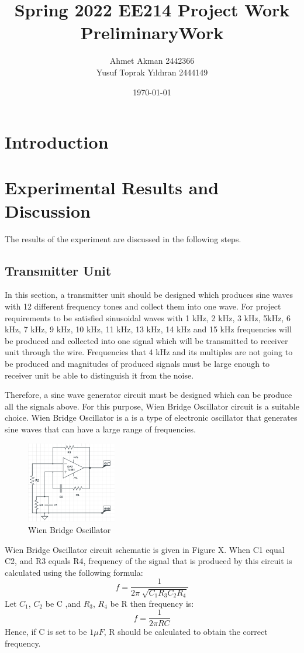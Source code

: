 \documentclass[letterpaper,12pt]{article}
\begin{document}
\thispagestyle{empty}

\title{Spring 2022 EE214 Project Work  \protect\\ PreliminaryWork }
\author{Ahmet Akman 2442366 \protect\\ Yusuf Toprak Yıldıran 2444149 }
\date{\today}
\maketitle
\tableofcontents
\section{Introduction}
\section{Experimental Results and Discussion}
The results of the experiment are discussed in the following steps.
%
\subsection{Transmitter Unit}
In this section, a transmitter unit should be designed which produces sine waves with 12 different frequency tones and collect them into one wave. For project requirements to be satisfied sinusoidal waves with 1 kHz, 2 kHz, 3 kHz, 5kHz, 6 kHz, 7 kHz, 9 kHz, 10 kHz, 11 kHz, 13 kHz, 14 kHz and 15 kHz frequencies will be produced and collected into one signal which will be transmitted to receiver unit through the wire. Frequencies that 4 kHz and its multiples are not going to be produced and magnitudes of produced signals must be large enough to receiver unit be able to distinguish it from the noise.

Therefore, a sine wave generator circuit must be designed which can be produce all the signals above. For this purpose, Wien Bridge Oscillator circuit is a suitable choice. Wien Bridge Oscillator is a is a type of electronic oscillator that generates sine waves that can have a large range of frequencies.
\begin{figure}[H]
    \centering
    \includegraphics[width = 0.35\textwidth]{WIENBRDGE.png}
    \caption{Wien Bridge Oscillator}
\end{figure} 
Wien Bridge Oscillator circuit schematic is given in Figure X. When C1 equal C2, and R3 equals R4, frequency of the signal that is produced by this circuit is calculated using the following formula:
\[f = \frac{1}{2\pi \sqrt[]{C_1R_3C_2R_4}}\]
Let \(C_1\), \(C_2\) be C ,and \(R_3\), \(R_4\) be R then frequency is:
\[f = \frac{1}{2\pi RC}\]
Hence, if C is set to be \(1\mu F\), R should be calculated to obtain the correct frequency. 
\end{document}
